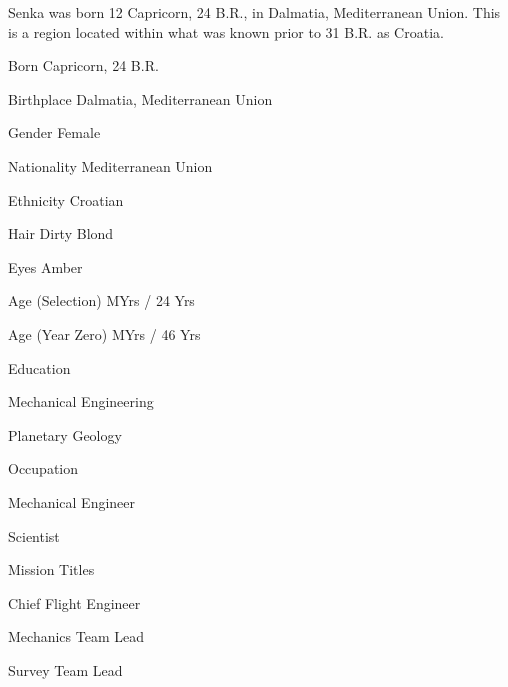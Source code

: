 

Senka was born 12 Capricorn, 24 B.R., in Dalmatia, Mediterranean Union. This is a region located within what was known prior to 31 B.R. as Croatia.
{
    \SetupCharacterTable

    \bTABLEbody
        \bTR
            \bTC Born \eTC
             Capricorn, 24 B.R. \eTC
        \eTR
        
        \bTR
            \bTC Birthplace \eTC
            \bTC Dalmatia, Mediterranean Union \eTC
        \eTR
        
        \bTR
            \bTC Gender \eTC
            \bTC Female \eTC
        \eTR
            
        \bTR
            \bTC Nationality \eTC
            \bTC Mediterranean Union \eTC
        \eTR
        
        \bTR
            \bTC Ethnicity \eTC
            \bTC Croatian \eTC
        \eTR
        
        \bTR
          \bTC Hair \eTC
          \bTC Dirty Blond \eTC
        \eTR
        
        \bTR
            \bTC Eyes \eTC
            \bTC Amber \eTC
        \eTR

        \bTR
            \bTC Age (Selection) \eTC %
             MYrs / 24 Yrs \eTC %
        \eTR

        \bTR
            \bTC Age (Year Zero) \eTC
             MYrs / 46 Yrs \eTC
        \eTR

        \bTR
            \bTC Education \eTC
            \bTC 
                \startitemize[4]
                \startpacked
                \item Mechanical Engineering
                \item Planetary Geology
                \stoppacked
                \stopitemize
            \eTC
        \eTR
        
        \bTR
            \bTC Occupation \eTC
            \bTC 
                \startitemize[4]
                \startpacked
                \item Mechanical Engineer
                \item Scientist
                \stoppacked
                \stopitemize
            \eTC
        \eTR
        
        \bTR
            \bTC Mission Titles \eTC
            \bTC 
                \startitemize[4]
                \startpacked
                \item Chief Flight Engineer
                \item Mechanics Team Lead
                \item Survey Team Lead
                \stoppacked
                \stopitemize
            \eTC
        \eTR
    \eTABLEbody

\eTABLE
}

